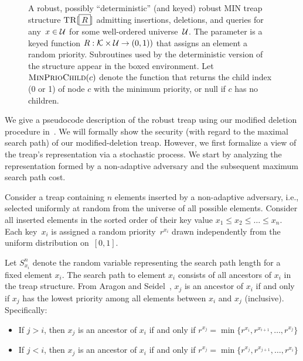 \begin{figure*}[h]
\begin{pchstack}[boxed,center,space=0.5em]
            \end{pchstack}
      \caption[A Robust Treap.]{A robust, possibly ``deterministic'' (and keyed) robust MIN treap structure $\textnormal{\textsc{TR}}[\boxed{R}]$ admitting insertions, deletions, and queries for any~$x \in \mathcal{U}$ for some well-ordered universe~$\mathcal{U}$. The parameter is a keyed function $R: \mathcal{K} \times \mathcal{U} \to (0,1))$ that assigns an element a random priority. Subroutines used by the deterministic version of the structure appear in the boxed environment. Let $\textnormal{\textsc{MinPrioChild}}(c)$ denote the function that returns the child index (0 or 1) of node $c$ with the minimum priority, or null if $c$ has no children.} 
      \label{fig:rtreap}
    \end{figure*}

We give a pseudocode description of the robust treap using our modified deletion procedure in~. We will formally show the security (with regard to the maximal search path) of our modified-deletion treap. However, we first formalize a view of the treap's representation via a stochastic process. We start by analyzing the representation formed by a non-adaptive adversary and the subsequent maximum search path cost. 

Consider a treap containing $n$ elements inserted by a non-adaptive adversary, i.e., selected uniformly at random from the universe of all possible elements. Consider all inserted elements in the sorted order of their key value $x_1 \leq x_2 \leq \ldots \leq x_n$. Each key~$x_i$ is assigned a random priority~$r^{x_{i}}$ drawn independently from the uniform distribution on~$[0,1]$. 

Let $S^n_{x_i}$ denote the random variable representing the search path length for a fixed element $x_i$. The search path to element $x_i$ consists of all ancestors of $x_i$ in the treap structure. From Aragon and Seidel~\cite{aragon1989randomized}, $x_j$ is an ancestor of $x_i$ if and only if $x_j$ has the lowest priority among all elements between $x_i$ and $x_j$ (inclusive). Specifically:

\begin{itemize}
    \item If $j > i$, then $x_j$ is an ancestor of $x_i$ if and only if $r^{x_j} = \min\{r^{x_i}, r^{x_{i+1}}, \ldots, r^{x_j}\}$
    \item If $j < i$, then $x_j$ is an ancestor of $x_i$ if and only if $r^{x_j} = \min\{r^{x_j}, r^{x_{j+1}}, \ldots, r^{x_i}\}$
\end{itemize}

